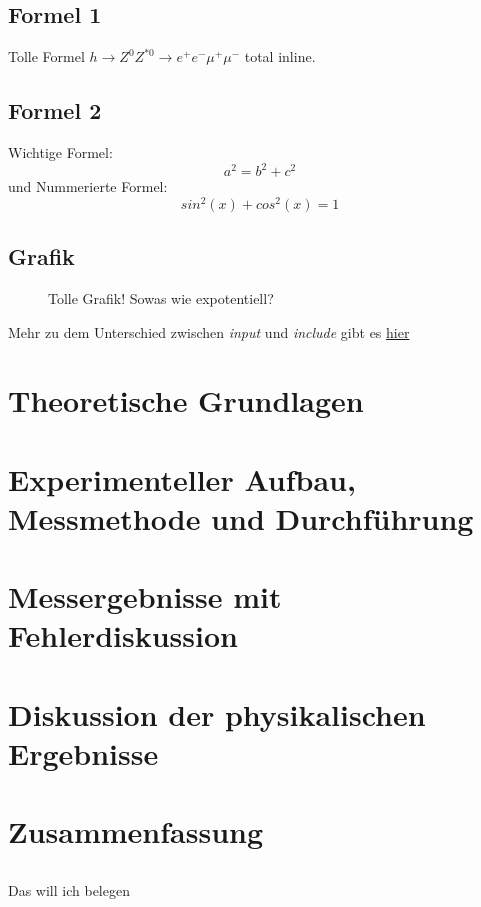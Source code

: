 \documentclass[10pt,a4paper]{article}
\begin{document}
\subsection{Formel 1} Tolle Formel $ h \rightarrow Z^0 Z^{*0} \rightarrow e^+ e^- \mu^+ \mu^- $ total inline.

\subsection{Formel 2} Wichtige Formel:
$$ a^2 = b^2 + c^2 $$
und Nummerierte Formel:
\begin{equation}
sin^2(x)+cos^2(x) = 1
\end{equation}


\subsection{Grafik}
\begin{figure}[h]
\centering


\caption[Parabel]{Tolle Grafik! Sowas wie expotentiell?}
\end{figure}
Mehr zu dem Unterschied zwischen \textit{input} und \textit{include} gibt es \href{http://de.wikibooks.org/wiki/LaTeX-W%C3%B6rterbuch:_include}{hier}



\section{Theoretische Grundlagen}
\section{Experimenteller Aufbau, Messmethode und Durchführung}
\section{Messergebnisse mit Fehlerdiskussion}
\section{Diskussion der physikalischen Ergebnisse}


\section{Zusammenfassung}
\subsection{}  Das will ich belegen \cite[p. 2]{erstesBuch}



\newpage





\newpage

\listoffigures %
\end{document}
